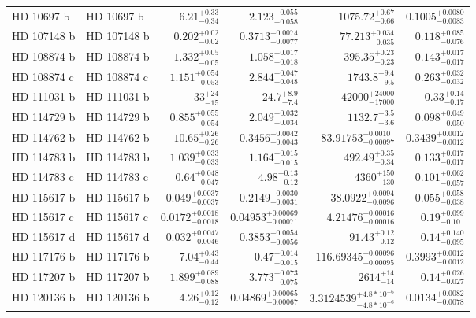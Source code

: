 \begin{longtable*}{llrrrr}
HD 10697 b & HD 10697 b & $6.21^{+0.33}_{-0.34}$ & $2.123^{+0.055}_{-0.058}$ & $1075.72^{+0.67}_{-0.66}$ & $0.1005^{+0.0080}_{-0.0083}$ \\ 
HD 107148 b & HD 107148 b & $0.202^{+0.02}_{-0.02}$ & $0.3713^{+0.0074}_{-0.0077}$ & $77.213^{+0.034}_{-0.035}$ & $0.118^{+0.085}_{-0.076}$ \\ 
HD 108874 b & HD 108874 b & $1.332^{+0.05}_{-0.05}$ & $1.058^{+0.017}_{-0.018}$ & $395.35^{+0.23}_{-0.23}$ & $0.143^{+0.017}_{-0.017}$ \\ 
HD 108874 c & HD 108874 c & $1.151^{+0.054}_{-0.053}$ & $2.844^{+0.047}_{-0.048}$ & $1743.8^{+9.4}_{-9.5}$ & $0.263^{+0.032}_{-0.032}$ \\ 
HD 111031 b & HD 111031 b & $33^{+24}_{-15}$ & $24.7^{+8.9}_{-7.4}$ & $42000^{+24000}_{-17000}$ & $0.33^{+0.14}_{-0.17}$ \\ 
HD 114729 b & HD 114729 b & $0.855^{+0.055}_{-0.054}$ & $2.049^{+0.032}_{-0.034}$ & $1132.7^{+3.5}_{-3.6}$ & $0.098^{+0.049}_{-0.050}$ \\ 
HD 114762 b & HD 114762 b & $10.65^{+0.26}_{-0.26}$ & $0.3456^{+0.0042}_{-0.0043}$ & $83.91753^{+0.0010}_{-0.00097}$ & $0.3439^{+0.0012}_{-0.0012}$ \\ 
HD 114783 b & HD 114783 b & $1.039^{+0.033}_{-0.033}$ & $1.164^{+0.015}_{-0.015}$ & $492.49^{+0.35}_{-0.34}$ & $0.133^{+0.017}_{-0.017}$ \\ 
HD 114783 c & HD 114783 c & $0.64^{+0.048}_{-0.047}$ & $4.98^{+0.13}_{-0.12}$ & $4360^{+150}_{-130}$ & $0.101^{+0.062}_{-0.057}$ \\ 
HD 115617 b & HD 115617 b & $0.049^{+0.0037}_{-0.0037}$ & $0.2149^{+0.0030}_{-0.0031}$ & $38.0922^{+0.0094}_{-0.0096}$ & $0.055^{+0.058}_{-0.038}$ \\ 
HD 115617 c & HD 115617 c & $0.0172^{+0.0018}_{-0.0018}$ & $0.04953^{+0.00069}_{-0.00071}$ & $4.21476^{+0.00016}_{-0.00016}$ & $0.19^{+0.099}_{-0.10}$ \\ 
HD 115617 d & HD 115617 d & $0.032^{+0.0047}_{-0.0046}$ & $0.3853^{+0.0054}_{-0.0056}$ & $91.43^{+0.12}_{-0.12}$ & $0.14^{+0.140}_{-0.095}$ \\ 
HD 117176 b & HD 117176 b & $7.04^{+0.43}_{-0.44}$ & $0.47^{+0.014}_{-0.015}$ & $116.69345^{+0.00096}_{-0.00095}$ & $0.3993^{+0.0012}_{-0.0012}$ \\ 
HD 117207 b & HD 117207 b & $1.899^{+0.089}_{-0.088}$ & $3.773^{+0.073}_{-0.075}$ & $2614^{+14}_{-14}$ & $0.14^{+0.026}_{-0.027}$ \\ 
HD 120136 b & HD 120136 b & $4.26^{+0.12}_{-0.12}$ & $0.04869^{+0.00065}_{-0.00067}$ & $3.3124539^{+4.8*10^{-6}}_{-4.8*10^{-6}}$ & $0.0134^{+0.0082}_{-0.0078}$ \\ 

\end{longtable*}
